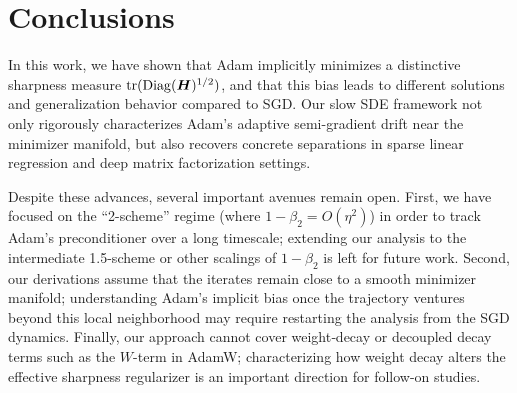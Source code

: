 
\section{Conclusions}

In this work, we have shown that Adam implicitly minimizes a distinctive sharpness measure $\text{tr}(\mathrm{Diag}({\bm{H}})^{1/2})$, and that this bias leads to different solutions and generalization behavior compared to SGD. Our slow SDE framework not only rigorously characterizes Adam’s adaptive semi-gradient drift near the minimizer manifold, but also recovers concrete separations in sparse linear regression and deep matrix factorization settings.

Despite these advances, several important avenues remain open. First, we have focused on the “2-scheme” regime (where $1-\beta_2=O(\eta^2)$) in order to track Adam’s preconditioner over a long timescale; extending our analysis to the intermediate 1.5-scheme or other scalings of $1-\beta_2$ is left for future work. Second, our derivations assume that the iterates remain close to a smooth minimizer manifold; understanding Adam’s implicit bias once the trajectory ventures beyond this local neighborhood may require restarting the analysis from the SGD dynamics. Finally, our approach cannot cover weight‐decay or decoupled decay terms such as the $W$-term in AdamW; characterizing how weight decay alters the effective sharpness regularizer is an important direction for follow-on studies.

